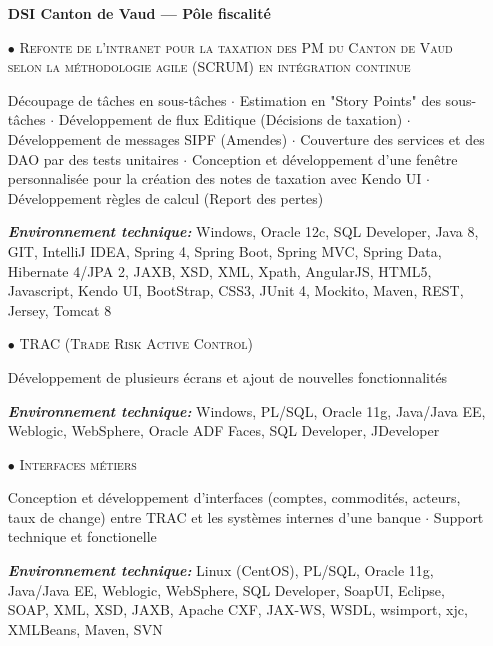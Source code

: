 \documentclass[10pt,a4paper]{moderncv}
\begin{document}
\vspace{1cm}

\begin{itemize}

	\item[] \textbf{DSI Canton de Vaud --- Pôle fiscalité}
	
	\item[$\bullet$] \textsc{Refonte de l’intranet pour la taxation des PM du Canton de Vaud selon la méthodologie agile (SCRUM) en intégration continue}
	\item[] Découpage de tâches en sous-tâches $\cdot$ Estimation en "Story Points" des sous-tâches $\cdot$ Développement de flux Editique (Décisions de taxation) $\cdot$ Développement de messages SIPF (Amendes) $\cdot$ Couverture des services et des DAO par des tests unitaires $\cdot$ Conception et développement d'une fenêtre personnalisée pour la création des notes de taxation avec Kendo UI $\cdot$ Développement règles de calcul (Report des pertes)
	\item[] \emph{\textbf{Environnement technique:}} Windows, Oracle 12c, SQL Developer, Java 8, GIT, IntelliJ IDEA, Spring 4, Spring Boot, Spring MVC, Spring Data, Hibernate 4/JPA 2, JAXB, XSD, XML, Xpath, AngularJS, HTML5, Javascript, Kendo UI, BootStrap, CSS3, JUnit 4, Mockito, Maven, REST, Jersey, Tomcat 8	
\end{itemize}


\clearpage

\begin{itemize}
		
	\item[$\bullet$] \textsc{TRAC (Trade Risk Active Control)}
	\item[] Développement de plusieurs écrans et ajout de nouvelles fonctionnalités		
	\item[] \emph{\textbf{Environnement technique:}} Windows, PL/SQL, Oracle 11g, Java/Java EE, Weblogic, WebSphere, Oracle ADF Faces, SQL Developer, JDeveloper

	\item[$\bullet$] \textsc{Interfaces métiers}
	\item[] Conception et développement d'interfaces (comptes, commodités, acteurs, taux de change) entre TRAC et les systèmes internes d'une banque $\cdot$ Support technique et fonctionelle      	 	
	\item[] \emph{\textbf{Environnement technique:}} Linux (CentOS), PL/SQL, Oracle 11g, Java/Java EE, Weblogic, WebSphere, SQL Developer, SoapUI, Eclipse, SOAP, XML, XSD, JAXB, Apache CXF, JAX-WS, WSDL, wsimport, xjc, XMLBeans, Maven, SVN	      	      	
\end{itemize}
\end{document}
